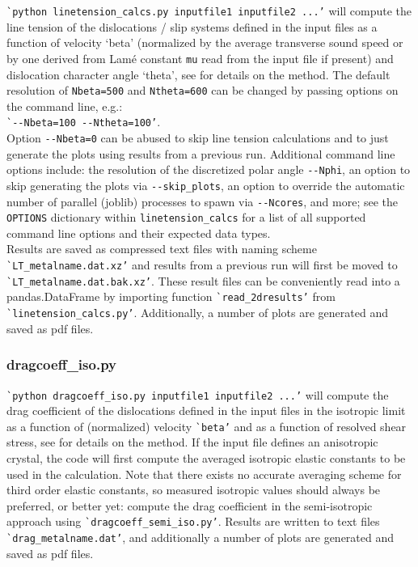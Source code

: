 \documentclass[11pt,letterpaper,oneside,pdftex]{article}
\begin{document}
\verb|`python linetension_calcs.py inputfile1 inputfile2 ...’| will compute the line tension of the dislocations / slip systems defined in the input files as a function of velocity ‘beta’ (normalized by the average transverse sound speed or by one derived from Lam\'e constant \verb|mu| read from the input file if present) and dislocation character angle ‘theta’, see \cite{Blaschke:2017lten} for details on the method.
The default resolution of \verb|Nbeta=500| and \verb|Ntheta=600| can be changed by passing options on the command line, e.g.:
\\\verb|`--Nbeta=100 --Ntheta=100’|.\\
Option \verb|--Nbeta=0| can be abused to skip line tension calculations and to just generate the plots using results from a previous run. 
Additional command line options include:
the resolution of the discretized polar angle \verb|--Nphi|,
an option to skip generating the plots via \verb|--skip_plots|,
an option to override the automatic number of parallel (joblib) processes to spawn via \verb|--Ncores|,
and more; see the \verb|OPTIONS| dictionary within \verb|linetension_calcs| for a list of all supported command line options and their expected data types.
\\
Results are saved as compressed text files with naming scheme \verb|`LT_metalname.dat.xz’| and results from a previous run will first be moved to \verb|`LT_metalname.dat.bak.xz’|.
These result files can be conveniently read into a pandas.DataFrame by importing function \verb|`read_2dresults’| from \verb|`linetension_calcs.py’|.
Additionally, a number of plots are generated and saved as pdf files.



\subsubsection{dragcoeff\_iso.py}

\verb|`python dragcoeff_iso.py inputfile1 inputfile2 ...’| will compute the drag coefficient of the dislocations defined in the input files in the isotropic limit as a function of (normalized) velocity \verb|`beta’| and as a function of resolved shear stress, see \cite{Blaschke:BpaperRpt,Blaschke:2019Bpap,Blaschke:2019a} for details on the method.
If the input file defines an anisotropic crystal, the code will first compute the averaged isotropic elastic constants to be used in the calculation.
Note that there exists no accurate averaging scheme for third order elastic constants, so measured isotropic values should always be preferred, or better yet: compute the drag coefficient in the semi-isotropic approach using  \verb|`dragcoeff_semi_iso.py’|.
Results are written to text files \verb|`drag_metalname.dat’|, and additionally a number of plots are generated and saved as pdf files.
\end{document}

